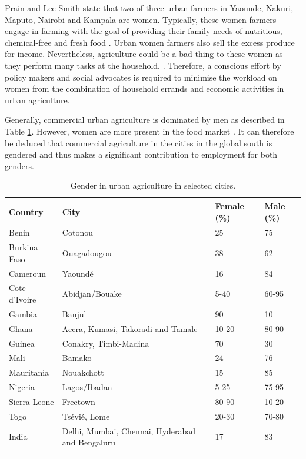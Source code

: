 Prain and Lee-Smith \cite{Prain2010} state that two of three urban farmers in Yaounde, Nakuri, Maputo, Nairobi and Kampala are women. Typically, these women farmers engage in farming with the goal of providing their family needs of nutritious, chemical-free and fresh food \cite{Gamhewage2015}. Urban women farmers also sell the excess produce for income. Nevertheless, agriculture could be a bad thing to these women as they perform many tasks at the household. \cite{Veenhuizen}. Therefore, a conscious effort by policy makers and social advocates is required to minimise the workload on women from the combination of household errands and economic activities in urban agriculture.

Generally, commercial urban agriculture is dominated by men as described in Table \ref{tbl:genderinUA}. However, women are more present in the food market \cite{Drechsel2014}. It can therefore be deduced that commercial agriculture in the cities in the global south is gendered and thus makes a significant contribution to employment for both genders.

\begin{table}[th]
\caption{Gender in urban agriculture in selected cities. \cite{Amoah2007}}
\begin{center}
\begin{tabular}{ p{} p{} p{} p{} } 
\hline
Country & City & Female (\%) & Male (\%) \\
\hline
Benin & Cotonou & 25 & 75 \\
Burkina Faso & Ouagadougou & 38 & 62 \\
Cameroun & Yaoundé & 16 & 84 \\
Cote d'Ivoire & Abidjan/Bouake & 5-40 & 60-95 \\
Gambia & Banjul & 90 & 10 \\
Ghana & Accra, Kumasi, Takoradi and Tamale & 10-20 & 80-90 \\
Guinea & Conakry, Timbi-Madina & 70 & 30 \\
Mali & Bamako & 24 & 76 \\
Mauritania & Nouakchott & 15 & 85 \\
Nigeria & Lagos/Ibadan & 5-25 & 75-95 \\
Sierra Leone & Freetown & 80-90 & 10-20 \\
Togo & Tsévié, Lome & 20-30 & 70-80 \\
India & Delhi, Mumbai, Chennai, Hyderabad and Bengaluru & 17 & 83 \\
\hline
\label{tbl:genderinUA}
\end{tabular}
\end{center}
\end{table}

